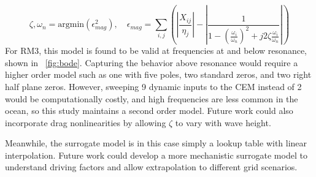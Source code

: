 \documentclass[10pt,twoside]{article}
\begin{document}
\begin{equation}\label{eq:bode-fit}
    \zeta,\omega_n = \mathrm{argmin}(\epsilon_{mag}^2), \quad
    \epsilon_{mag} = \sum_{i,j}^{} \left(\left|\frac{X_{ij}}{\eta_j}\right|-\left|\frac{1}{1-\left(\frac{\omega_i}{\omega_n}\right)^2 + j 2 \zeta \frac{\omega_i}{\omega_n}}\right|\right)
\end{equation}
For RM3, this model is found to be valid at frequencies at and below resonance, shown in \figureautorefname~\ref{fig:bode}.
Capturing the behavior above resonance would require a higher order model such as one with five poles, two standard zeros, and two right half plane zeros.
However, sweeping 9 dynamic inputs to the CEM instead of 2 would be computationally costly, and high frequencies are less common in the ocean, so this study maintains a second order model.
Future work could also incorporate drag nonlinearities by allowing $\zeta$ to vary with wave height.


Meanwhile, the surrogate model is in this case simply a lookup table with linear interpolation.
Future work could develop a more mechanistic surrogate model to understand driving factors and allow extrapolation to different grid scenarios.

\end{document}
